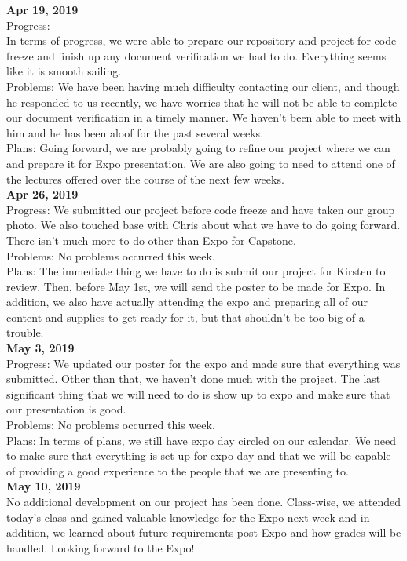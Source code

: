 \textbf{Apr 19, 2019}\\
Progress:
\\ In terms of progress, we were able to prepare our repository and project for code freeze and finish up any document verification we had to do. Everything seems like it is smooth sailing.
\\
Problems: We have been having much difficulty contacting our client, and though he responded to us recently, we have worries that he will not be able to complete our document verification in a timely manner. We haven't been able to meet with him and he has been aloof for the past several weeks.
\\
Plans: Going forward, we are probably going to refine our project where we can and prepare it for Expo presentation. We are also going to need to attend one of the lectures offered over the course of the next few weeks.
\\
\textbf{Apr 26, 2019}\\
Progress: We submitted our project before code freeze and have taken our group photo. We also touched base with Chris about what we have to do going forward. There isn't much more to do other than Expo for Capstone.
\\
Problems: No problems occurred this week.
\\
Plans: The immediate thing we have to do is submit our project for Kirsten to review. Then, before May 1st, we will send the poster to be made for Expo. In addition, we also have actually attending the expo and preparing all of our content and supplies to get ready for it, but that shouldn't be too big of a trouble.
\\
\textbf{May 3, 2019}\\
Progress: We updated our poster for the expo and made sure that everything was submitted. Other than that, we haven't done much with the project. The last significant thing that we will need to do is show up to expo and make sure that our presentation is good. 
\\
Problems: No problems occurred this week.
\\
Plans: In terms of plans, we still have expo day circled on our calendar. We need to make sure that everything is set up for expo day and that we will be capable of providing a good experience to the people that we are presenting to. 
\\
\textbf{May 10, 2019}\\
No additional development on our project has been done. Class-wise, we attended today’s class and gained valuable knowledge for the Expo next week and in addition, we learned about future requirements post-Expo and how grades will be handled. Looking forward to the Expo!
\\